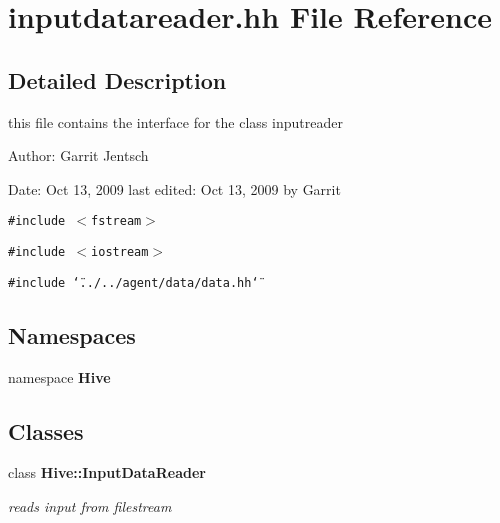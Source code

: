 \section{inputdatareader.hh File Reference}
\label{inputdatareader_8hh}


\subsection{Detailed Description}
this file contains the interface for the class inputreader

\begin{Desc}
\item[Author:]Garrit Jentsch\end{Desc}
\begin{Desc}
\item[Date:]Oct 13, 2009 last edited: Oct 13, 2009 by Garrit \end{Desc}


{\tt \#include $<$fstream$>$}\par
{\tt \#include $<$iostream$>$}\par
{\tt \#include \char`\"{}../../agent/data/data.hh\char`\"{}}\par
\subsection*{Namespaces}
\begin{CompactItemize}
\item 
namespace {\bf Hive}
\end{CompactItemize}
\subsection*{Classes}
\begin{CompactItemize}
\item 
class {\bf Hive::InputDataReader}
\begin{CompactList}\small\item\em reads input from filestream \item\end{CompactList}\end{CompactItemize}
